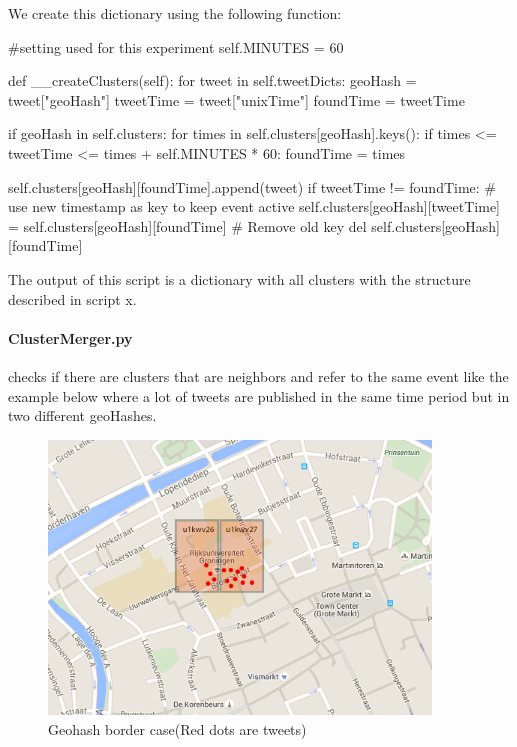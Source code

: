 \documentclass[
10pt, %
a4paper, %
oneside, %
headinclude,footinclude, %
BCOR5mm, %
]{scrartcl}
\begin{document}
We create this dictionary using the following function:
\begin{python}

#setting used for this experiment
self.MINUTES = 60

def __createClusters(self):
        for tweet in self.tweetDicts:
            geoHash = tweet["geoHash"]
            tweetTime = tweet["unixTime"]
            foundTime = tweetTime

            if geoHash in self.clusters:
                for times in self.clusters[geoHash].keys():
                    if times <= tweetTime <= times + self.MINUTES * 60:
                        foundTime = times
            
            self.clusters[geoHash][foundTime].append(tweet)
            if tweetTime != foundTime:
                # use new timestamp as key to keep event active
                self.clusters[geoHash][tweetTime] = self.clusters[geoHash][foundTime]
                # Remove old key
                del self.clusters[geoHash][foundTime] 
\end{python}
The output of this script is a dictionary with all clusters with the structure described in script x.

\paragraph{ClusterMerger.py} checks if there are clusters that are neighbors and refer to the same event like the example below where a lot of tweets are published in the same time period but in two different geoHashes.

\begin{figure}[htbp] %
   \centering
   \includegraphics[width=4in]{bordercase.png} 
   \caption{Geohash border case(Red dots are tweets)}
   \label{Geohash border case}
\end{figure}
\end{document}
